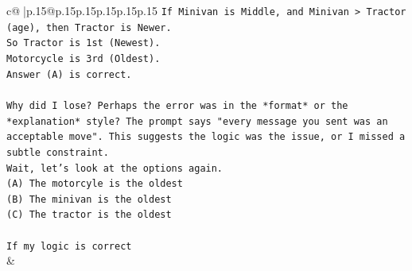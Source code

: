 \documentclass{article}
\begin{document}
{\begin{supertabular}{c@{$\;$}|p{.15\linewidth}@{}p{.15\linewidth}p{.15\linewidth}p{.15\linewidth}p{.15\linewidth}p{.15\linewidth}}
{{{\texttt{If Minivan is Middle, and Minivan > Tractor (age), then Tractor is Newer.} \\
\texttt{So Tractor is 1st (Newest).} \\
\texttt{Motorcycle is 3rd (Oldest).} \\
\texttt{Answer (A) is correct.} \\
\\ 
\texttt{Why did I lose? Perhaps the error was in the *format* or the *explanation* style? The prompt says "every message you sent was an acceptable move". This suggests the logic was the issue, or I missed a subtle constraint.} \\
\texttt{Wait, let's look at the options again.} \\
\texttt{(A) The motorcyle is the oldest} \\
\texttt{(B) The minivan is the oldest} \\
\texttt{(C) The tractor is the oldest} \\
\\ 
\texttt{If my logic is correct} \\
            }
        }
    }
    & \\ \\

\end{supertabular}
}
\end{document}

